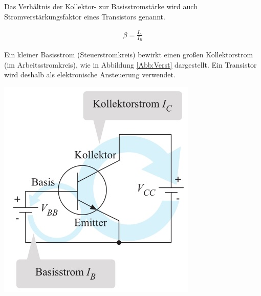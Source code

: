 \begin{sich}
Das Verhältnis der Kollektor- zur Basisstromstärke wird auch Stromverstär\-kungsfaktor eines Transistors genannt.

\begin{align*}
\beta = \frac{I_C}{I_B}
\end{align*}

Ein kleiner Basisstrom (Steuerstromkreis) bewirkt einen großen Kollektorstrom (im Arbeitsstromkreis), wie in Abbildung \ref{Abb:Verst} dargestellt. Ein Transistor wird deshalb als elektronische Ansteuerung verwendet.

\begin{center}
\includegraphics[scale=.6]{pics/StromTrans}
\end{center}
\label{Abb:Verst}
\end{sich}


